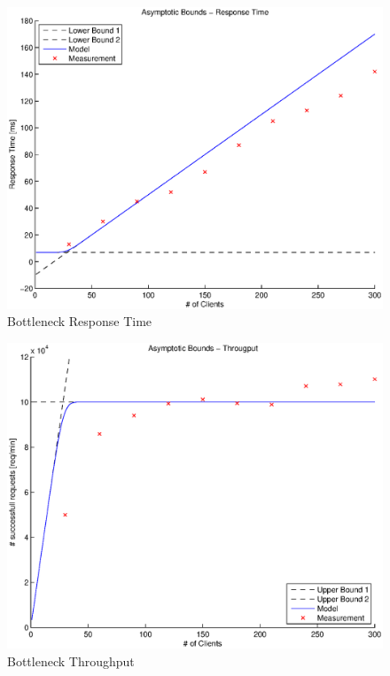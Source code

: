 \documentclass[a4paper]{article}
\begin{document}







\begin{figure}[H]
	\begin{center}
    \includegraphics[scale=0.6]{../plots-ms2-mg/bottleneck-rt.eps}
  \end{center}
  \caption{Bottleneck Response Time}
  \label{fig:bottleneck-rt}
\end{figure}




\begin{figure}[H]
	\begin{center}
    \includegraphics[scale=0.6]{../plots-ms2-mg/bottleneck-tp.eps}
  \end{center}
  \caption{Bottleneck Throughput}
  \label{fig:bottleneck-tp}
\end{figure}
\end{document}
